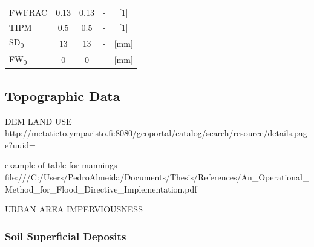 \begin{table}[h]
\begin{tabular}{lcccc}
FWFRAC             & 0.13                                                                                       & 0.13                                                                                       & -                                                                                                 & {[}1{]}             \\
TIPM               & 0.5                                                                                        & 0.5                                                                                        & -                                                                                                 & {[}1{]}             \\
SD\textsubscript{0}                & 13                                                                                         & 13                                                                                         & -                                                                                                 & {[}mm{]}            \\
FW\textsubscript{0}                & 0                                                                                          & 0                                                                                          & -                                                                                                 & {[}mm{]}           
\end{tabular}
\end{table}

        
    \subsection{Topographic Data}
    DEM
    LAND USE
    http://metatieto.ymparisto.fi:8080/geoportal/catalog/search/resource/details.page?uuid=%
    
    example of table for mannings 
    file:///C:/Users/PedroAlmeida/Documents/Thesis/References/An_Operational_Method_for_Flood_Directive_Implementation.pdf
    
    URBAN AREA
    IMPERVIOUSNESS
    \subsubsection{Soil Superficial Deposits}
    
